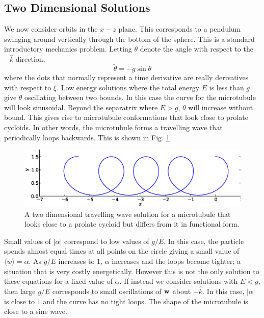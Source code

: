 \documentclass[11pt]{ucthesis}
\def\bw{{\bf w}}
\begin{document}
\subsection{Two Dimensional Solutions}
\label{subsec:2dsolns}

We now consider orbits in the $x-z$ plane. This corresponds to a pendulum swinging around vertically through the bottom of the sphere.
This is a standard introductory mechanics problem. Letting $\theta$ denote the angle with respect to the $-{\hat k}$ direction,
\begin{equation}
\label{eq:pendulum}
\ddot{\theta} = -g \sin\theta 
\end{equation}
where the dots that normally represent a time derivative are really derivatives with respect to $\xi$. Low energy solutions
where the total energy $E$ is less than $g$ give $\theta$ oscillating between two bounds. 
In this case the curve for the microtubule will look sinusoidal. Beyond the separatrix where $E > g$, $\theta$ will
increase without bound. This gives rise to microtubule conformations that look close to prolate cycloids. In other words,
the microtubule forms a travelling wave that periodically loops backwards. This is shown in Fig. \ref{fig:prolate}

\begin{figure}[htp]
\begin{center}
\includegraphics[width=\hsize]{shape1.eps}
\caption{ 
A two dimensional travelling wave solution for a microtubule that looks close to a prolate cycloid but
differs from it in functional form.
}
\label{fig:prolate}
\end{center}
\end{figure}

Small values of $|\alpha|$ correspond to low values of $g/E$. In this case, the particle spends almost
equal times at all points on the circle giving a small value of $\langle w\rangle = \alpha$. As $g/E$
increases to $1$, $\alpha$ increases and the loops become tighter; a situation that is very costly energetically.
However this is not the only solution to these equations for a fixed value of $\alpha$. If instead we
consider solutions with $E < g$, then large $g/E$ corresponds to small oscillations of $\bw$ about $-{\hat k}$.
In this case, $|\alpha|$ is close to $1$ and the curve has no tight loops. The shape of the microtubule
is close to a sine wave.
\end{document}
